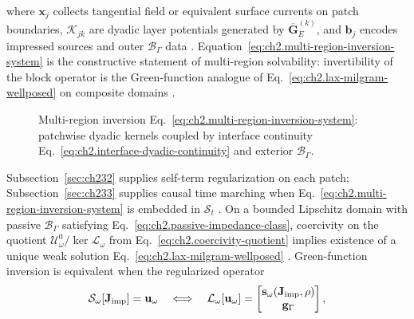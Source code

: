 where \(\mathbf{x}_j\) collects tangential field or equivalent surface currents on
patch boundaries, \(\mathcal{K}_{jk}\) are dyadic layer potentials generated by
\(\overline{\mathbf{G}}_{E}^{(k)}\), and \(\mathbf{b}_j\) encodes impressed sources
and outer \(\mathcal{B}_\Gamma\) data \cite{harrington2001}.
Equation~\eqref{eq:ch2.multi-region-inversion-system} is the constructive statement of
multi-region solvability: invertibility of the block operator is the
Green-function analogue of Eq.~\eqref{eq:ch2.lax-milgram-wellposed} on composite
domains \cite{stratton1941}.
\begin{figure}[t]
\centering
{}
\caption{Multi-region inversion Eq.~\eqref{eq:ch2.multi-region-inversion-system}:
patchwise dyadic kernels coupled by interface continuity
Eq.~\eqref{eq:ch2.interface-dyadic-continuity} and exterior
\(\mathcal{B}_\Gamma\).}
\label{fig:ch2.multi-region-green-assembly}
\end{figure}
Subsection~\ref{sec:ch232} supplies
self-term regularization on each patch; Subsection~\ref{sec:ch233} supplies causal
time marching when Eq.~\eqref{eq:ch2.multi-region-inversion-system} is embedded in
\(\mathcal{S}_t\) \cite{harrington2001}. On a bounded Lipschitz domain with passive \(\mathcal{B}_\Gamma\) satisfying
Eq.~\eqref{eq:ch2.passive-impedance-class}, coercivity on the quotient
\(\mathcal{U}_\omega^{0}/\ker\mathcal{L}_\omega\) from
Eq.~\eqref{eq:ch2.coercivity-quotient} implies existence of a unique weak solution
Eq.~\eqref{eq:ch2.lax-milgram-wellposed} \cite{stratton1941}. Green-function
inversion is equivalent when the regularized operator
\begin{equation}
\label{eq:ch2.green-bvp-equivalence}
\mathcal{S}_\omega[\mathbf{J}_{\mathrm{imp}}]
=
\mathbf{u}_\omega
\quad\Longleftrightarrow\quad
\mathcal{L}_\omega[\mathbf{u}_\omega]
=
\begin{bmatrix}\mathbf{s}_\omega(\mathbf{J}_{\mathrm{imp}},\rho)\\ \mathbf{g}_\Gamma\end{bmatrix},
\end{equation}
